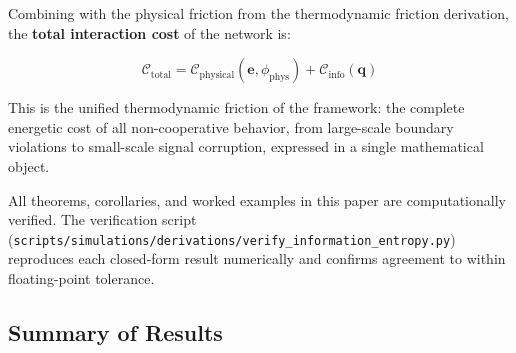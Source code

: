 \documentclass[11pt]{article}
\theoremstyle{plain}
\theoremstyle{definition}
\theoremstyle{remark}
\let\origsubsection\subsection
\renewcommand{\subsection}{\needspace{7\baselineskip}\origsubsection}
\begin{document}
Combining with the physical friction from the thermodynamic friction
derivation, the \textbf{total interaction cost} of the network is:

\[\mathcal{C}_{\text{total}} = \mathcal{C}_{\text{physical}}(\mathbf{e}, \phi_{\text{phys}}) + \mathcal{C}_{\text{info}}(\mathbf{q})\]

This is the unified thermodynamic friction of the framework: the
complete energetic cost of all non-cooperative behavior, from
large-scale boundary violations to small-scale signal corruption,
expressed in a single mathematical object.

All theorems, corollaries, and worked examples in this paper are
computationally verified. The verification script
(\texttt{scripts/simulations/derivations/verify\_information\_entropy.py})
reproduces each closed-form result numerically and confirms agreement to
within floating-point tolerance.

\subsection{Summary of Results}\label{summary-of-results-1}
\end{document}
